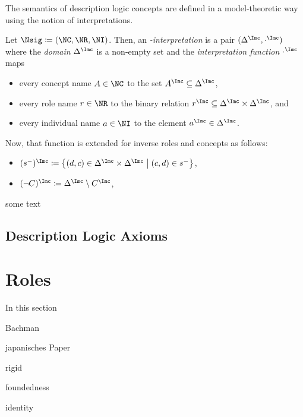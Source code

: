 The semantics of description logic concepts are defined in a model-theoretic way using the notion of
interpretations.

\begin{definition}
  \label{def:n-interpretation}
  Let $\Nsig\coloneqq(\NC,\NR,\NI)$. Then, an \emph{\Nsig-interpretation \I} is a pair
  $(\Delta^{\I}, \cdot^{\I})$ where the \emph{domain} $\Delta^{\I}$ is a non-empty set and
  the \emph{interpretation function} $\cdot^{\I}$ maps 
  \begin{itemize}
  \item every concept name $A\in\NC$ to the set $A^{\I}\subseteq\Delta^{\I}$,
  \item every role name $r\in\NR$ to the binary relation
    $r^{\I}\subseteq\Delta^{\I}\times\Delta^{\I}$, and
  \item every individual name $a\in\NI$ to the element $a^{\I}\in\Delta^{\I}$. \qedhere
  \end{itemize}

  Now, that function is extended for inverse roles and concepts as follows:
  \begin{itemize}
  \item $(s^{-})^{\I} \coloneqq \left\{(d,c)\in\Delta^{\I}\times\Delta^{\I}\mmid (c,d)\in
      s^{-}\right\}$,
  \item $(\lnot C)^{\I} \coloneqq \Delta^{\I} \setminus C^{\I}$,
  \end{itemize}
\end{definition}


some text

\begin{example}
  
\end{example}




\subsection{Description Logic Axioms}
\label{sec:dl-axioms}



\clearpage

\section{Roles}
\label{sec:rosiroles}

In this section 

Bachman

japanisches Paper

rigid

foundedness

identity




